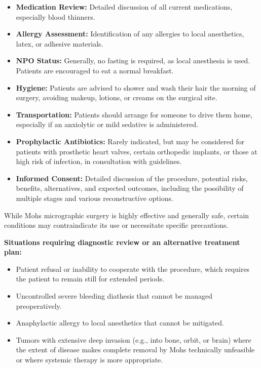 \begin{itemize}
  \item \textbf{Medication Review:} Detailed discussion of all current medications, especially blood thinners.
  
  \item \textbf{Allergy Assessment:} Identification of any allergies to local anesthetics, latex, or adhesive materials.
  
  \item \textbf{NPO Status:} Generally, no fasting is required, as local anesthesia is used. Patients are encouraged to eat a normal breakfast.
  
  \item \textbf{Hygiene:} Patients are advised to shower and wash their hair the morning of surgery, avoiding makeup, lotions, or creams on the surgical site.
  
  \item \textbf{Transportation:} Patients should arrange for someone to drive them home, especially if an anxiolytic or mild sedative is administered.
  
  \item \textbf{Prophylactic Antibiotics:} Rarely indicated, but may be considered for patients with prosthetic heart valves, certain orthopedic implants, or those at high risk of infection, in consultation with guidelines.
  
  \item \textbf{Informed Consent:} Detailed discussion of the procedure, potential risks, benefits, alternatives, and expected outcomes, including the possibility of multiple stages and various reconstructive options.
\end{itemize}

While Mohs micrographic surgery is highly effective and generally safe, certain conditions may contraindicate its use or necessitate specific precautions.

\textbf{Situations requiring diagnostic review or an alternative treatment plan:}
\begin{itemize}
  \item Patient refusal or inability to cooperate with the procedure, which requires the patient to remain still for extended periods.
  
  \item Uncontrolled severe bleeding diathesis that cannot be managed preoperatively.
  
  \item Anaphylactic allergy to local anesthetics that cannot be mitigated.
  
  \item Tumors with extensive deep invasion (e.g., into bone, orbit, or brain) where the extent of disease makes complete removal by Mohs technically unfeasible or where systemic therapy is more appropriate.
\end{itemize}

